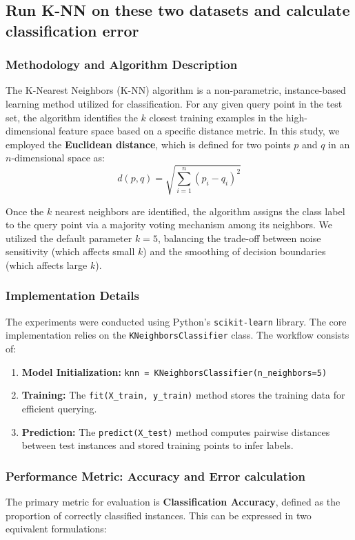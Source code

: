 \documentclass[12pt]{article}
\begin{document}
\subsection{Run K-NN on these two datasets and calculate classification error}

\subsubsection{Methodology and Algorithm Description}
The K-Nearest Neighbors (K-NN) algorithm is a non-parametric, instance-based learning method utilized for classification. For any given query point in the test set, the algorithm identifies the $k$ closest training examples in the high-dimensional feature space based on a specific distance metric. In this study, we employed the \textbf{Euclidean distance}, which is defined for two points $p$ and $q$ in an $n$-dimensional space as:
\begin{equation}
    d(p, q) = \sqrt{\sum_{i=1}^{n} (p_i - q_i)^2}
\end{equation}

Once the $k$ nearest neighbors are identified, the algorithm assigns the class label to the query point via a majority voting mechanism among its neighbors. We utilized the default parameter $k=5$, balancing the trade-off between noise sensitivity (which affects small $k$) and the smoothing of decision boundaries (which affects large $k$).

\subsubsection{Implementation Details}
The experiments were conducted using Python's \texttt{scikit-learn} library. The core implementation relies on the \texttt{KNeighborsClassifier} class. The workflow consists of:
\begin{enumerate}
    \item \textbf{Model Initialization:} \texttt{knn = KNeighborsClassifier(n\_neighbors=5)}
    \item \textbf{Training:} The \texttt{fit(X\_train, y\_train)} method stores the training data for efficient querying.
    \item \textbf{Prediction:} The \texttt{predict(X\_test)} method computes pairwise distances between test instances and stored training points to infer labels.
\end{enumerate}

\subsubsection{Performance Metric: Accuracy and Error calculation}
The primary metric for evaluation is \textbf{Classification Accuracy}, defined as the proportion of correctly classified instances. This can be expressed in two equivalent formulations:
\end{document}
